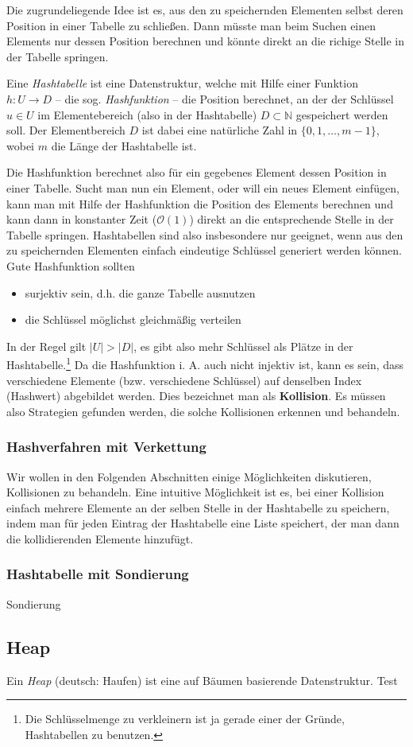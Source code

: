 Die zugrundeliegende Idee ist es, aus den zu speichernden Elementen selbst deren Position in einer Tabelle zu schließen. Dann müsste man beim Suchen einen Elements nur dessen Position berechnen und könnte direkt an die richige Stelle in der Tabelle springen.

\begin{defi}
	Eine \emph{Hashtabelle} ist eine Datenstruktur, welche mit Hilfe einer Funktion $h : U \rightarrow D$ -- die sog. \emph{Hashfunktion} -- die Position berechnet, an der der Schlüssel $u \in U$ im Elementebereich (also in der Hashtabelle) $D \subset \mathbb{N}$ gespeichert werden soll. Der Elementbereich $D$ ist dabei eine natürliche Zahl in $\{0, 1, \dots, m-1\}$, wobei $m$ die Länge der Hashtabelle ist.
\end{defi}

Die Hashfunktion berechnet also für ein gegebenes Element dessen Position in einer Tabelle. Sucht man nun ein Element, oder will ein neues Element einfügen, kann man mit Hilfe der Hashfunktion die Position des Elements berechnen und kann dann in konstanter Zeit ($\mathcal{O}(1)$) direkt an die entsprechende Stelle in der Tabelle springen.
Hashtabellen sind also insbesondere nur geeignet, wenn aus den zu speichernden Elementen einfach eindeutige Schlüssel generiert werden können. \\
Gute Hashfunktion sollten
\begin{itemize}
	\item surjektiv sein, d.h. die ganze Tabelle ausnutzen
	\item die Schlüssel möglichst gleichmäßig verteilen
\end{itemize}

\begin{anm}
  In der Regel gilt $|U| > |D|$, es gibt also mehr Schlüssel als Plätze in der Hashtabelle.\footnote{Die Schlüsselmenge zu verkleinern ist ja gerade einer der Gründe, Hashtabellen zu benutzen.} Da die Hashfunktion i. A. auch nicht injektiv ist, kann es sein, dass verschiedene Elemente (bzw. verschiedene Schlüssel) auf denselben Index (Hashwert) abgebildet werden. Dies bezeichnet man als \textbf{Kollision}. Es müssen also Strategien gefunden werden, die solche Kollisionen erkennen und behandeln.
\end{anm}

\subsubsection{Hashverfahren mit Verkettung}
Wir wollen in den Folgenden Abschnitten einige Möglichkeiten diskutieren, Kollisionen zu behandeln. Eine intuitive Möglichkeit ist es, bei einer Kollision einfach mehrere Elemente an der selben Stelle in der Hashtabelle zu speichern, indem man für jeden Eintrag der Hashtabelle eine Liste speichert, der man dann die kollidierenden Elemente hinzufügt.

\subsubsection{Hashtabelle mit Sondierung}
Sondierung

\subsection{Heap}
Ein \emph{Heap} (deutsch: Haufen) ist eine auf Bäumen basierende Datenstruktur.
Test
